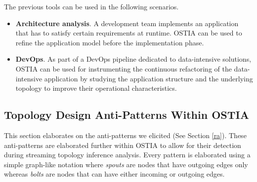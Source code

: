 \documentclass[smallextended]{svjour3}       %
\newcommand{\todoMB}[2]{\linespread{0.7}\todo[color=yellow!50,#1]{\scriptsize\textbf{MB:}#2}}
\begin{document}
{\noindent
The previous tools can be used in the following scenarios.
\begin{itemize}
	\item \textbf{Architecture analysis}. A development team implements an application that has to satisfy certain requirements at runtime. OSTIA can be used to refine the application model before the implementation phase.
	\item \textbf{DevOps}. As part of a DevOps pipeline dedicated to data-intensive solutions, OSTIA can be used for instrumenting the continuous refactoring of the data-intensive application by studying the application structure and the underlying topology to improve their operational characteristics.
\end{itemize}
}



\subsection{Topology Design Anti-Patterns Within OSTIA}\label{sec:anti-pattern}
This section elaborates on the anti-patterns we elicited (See Section \ref{ra}). These anti-patterns are elaborated further within OSTIA to allow for their detection during streaming topology inference analysis. Every pattern is elaborated using a simple graph-like notation where \emph{spouts} are nodes that have outgoing edges only whereas \emph{bolts} are nodes that can have either incoming or outgoing edges.
\end{document}
